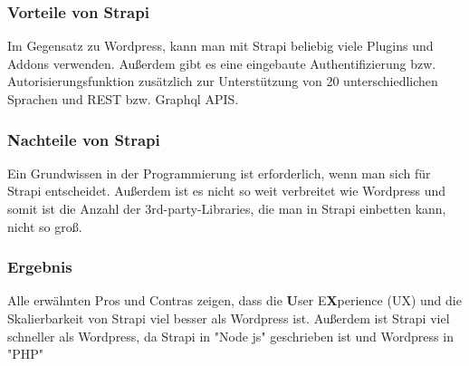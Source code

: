\begin{spacing}{1}
    \subsubsection{Vorteile von Strapi}

    Im Gegensatz zu Wordpress, kann man mit Strapi beliebig viele Plugins und Addons
    verwenden. Außerdem gibt es eine eingebaute Authentifizierung bzw. Autorisierungsfunktion
    zusätzlich zur Unterstützung von 20 unterschiedlichen Sprachen und REST
    bzw. Graphql APIS.
    \cite{strapi-vs-wordpress}

    \subsubsection{Nachteile von Strapi}
    Ein Grundwissen in der Programmierung ist erforderlich, wenn man sich für Strapi
    entscheidet. Außerdem ist es nicht so weit verbreitet wie Wordpress und somit ist die Anzahl
    der 3rd-party-Libraries, die man in Strapi einbetten kann, nicht so groß.
    \cite{strapi-vs-wordpress}

    \subsubsection{Ergebnis}
    Alle erwähnten Pros und Contras zeigen, dass  die \textbf{U}ser E\textbf{X}perience (UX)
    und die Skalierbarkeit von Strapi viel besser als Wordpress ist.
    Außerdem ist Strapi viel schneller als Wordpress,
    da Strapi in "Node js" geschrieben ist und Wordpress in "PHP"
    \cite{strapi-vs-wordpress}
\end{spacing}